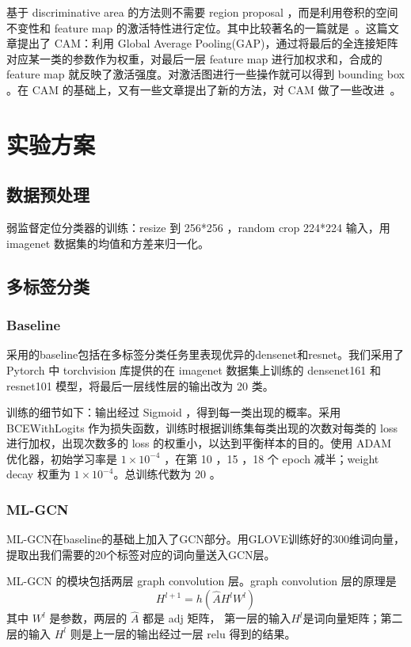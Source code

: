 \documentclass[a4paper]{ctexart}
\begin{document}
基于 discriminative area 的方法则不需要 region proposal ，而是利用卷积的空间不变性和 feature map 的激活特性进行定位。其中比较著名的一篇就是~\cite{zhou2016learning}。这篇文章提出了 CAM：利用 Global Average Pooling(GAP)，通过将最后的全连接矩阵对应某一类的参数作为权重，对最后一层 feature map 进行加权求和，合成的 feature map 就反映了激活强度。对激活图进行一些操作就可以得到 bounding box 。在 CAM 的基础上，又有一些文章提出了新的方法，对 CAM 做了一些改进~\cite{singh2017hide, zhu2017soft}。

\section{实验方案}
\subsection{数据预处理}

弱监督定位分类器的训练：resize 到 256*256 ，random crop 224*224 输入，用 imagenet 数据集的均值和方差来归一化。

\subsection{多标签分类}
\subsubsection{Baseline}
采用的baseline包括在多标签分类任务里表现优异的densenet和resnet。我们采用了 Pytorch 中 torchvision 库提供的在 imagenet 数据集上训练的 densenet161 和 resnet101 模型，将最后一层线性层的输出改为 20 类。

训练的细节如下：输出经过 Sigmoid ，得到每一类出现的概率。采用 BCEWithLogits 作为损失函数，训练时根据训练集每类出现的次数对每类的 loss 进行加权，出现次数多的 loss 的权重小，以达到平衡样本的目的。使用 ADAM 优化器，初始学习率是 $1\times10^{-4}$ ，在第 10 ，15 ，18 个 epoch 减半；weight decay 权重为 $1\times10^{-4}$。总训练代数为 20 。

\subsubsection{ML-GCN}

ML-GCN在baseline的基础上加入了GCN部分。用GLOVE训练好的300维词向量，提取出我们需要的20个标签对应的词向量送入GCN层。

ML-GCN 的模块包括两层 graph convolution 层。graph convolution 层的原理是
    \begin{equation}
        H^{l+1} = h(\hat{A}H^lW^l)
    \end{equation}
其中 $W^l$ 是参数，两层的 $\hat{A}$ 都是 adj 矩阵， 第一层的输入$H^l$是词向量矩阵；第二层的输入 $H^l$ 则是上一层的输出经过一层 relu 得到的结果。
\end{document}
